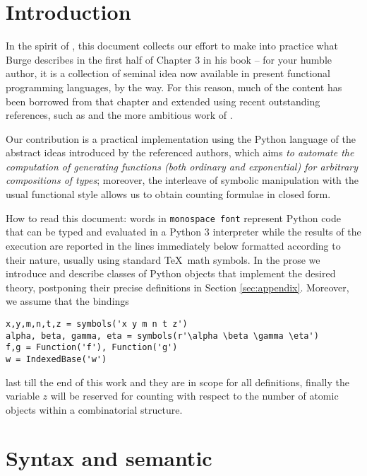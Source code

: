 
\section{Introduction}

In the spirit of \citet{burge1975recursive}, this document collects our effort
to make into practice what Burge describes in the first half of Chapter $3$ in
his book -- for your humble author, it is a collection of seminal idea now
available in present functional programming languages, by the way. For this
reason, much of the content has been borrowed from that chapter and extended
using recent outstanding references, such as \citet{sedgewick2014introduction}
and the more ambitious work of \citet{flajolet2009analytic}.

Our contribution is a practical implementation using the Python language of the
abstract ideas introduced by the referenced authors, which aims \emph{to
automate the computation of generating functions (both ordinary and
exponential) for arbitrary compositions of types}; moreover, the interleave of
symbolic manipulation with the usual functional style allows us to obtain
counting formulae in closed form.

How to read this document: words in \texttt{monospace font} represent Python
code that can be typed and evaluated in a Python 3 interpreter while the
results of the execution are reported in the lines immediately below formatted
according to their nature, usually using standard \TeX\, math symbols. In the
prose we introduce and describe classes of Python objects that implement the
desired theory, postponing their precise definitions in Section
\ref{sec:appendix}. Moreover, we assume that the bindings
\begin{verbatim}
x,y,m,n,t,z = symbols('x y m n t z')
alpha, beta, gamma, eta = symbols(r'\alpha \beta \gamma \eta')
f,g = Function('f'), Function('g')
w = IndexedBase('w')
\end{verbatim}
last till the end of this work and they are in scope for all definitions, finally
the variable $z$ will be reserved for counting with respect to the number of
atomic objects within a combinatorial structure.

\section{Syntax and semantic}

